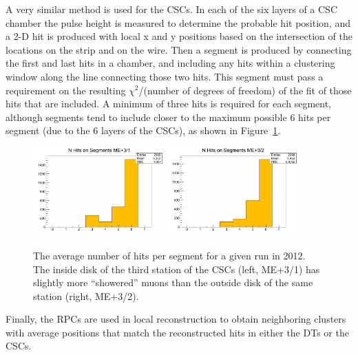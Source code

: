 A very similar method is used for the CSCs.  In each of the six layers of a CSC chamber the pulse height is measured to determine the probable hit position, and a 2-D hit is produced with local x and y positions based on the intersection of the locations on the strip and on the wire.  Then a segment is produced by connecting the first and last hits in a chamber, and including any hits within a clustering window along the line connecting those two hits.  This segment must pass a requirement on the resulting $\chi^2$/(number of degrees of freedom) of the fit of those hits that are included.  A minimum of three hits is required for each segment, although segments tend to include closer to the maximum possible 6 hits per segment (due to the 6 layers of the CSCs), as shown in Figure~\ref{figapp:SegmentsPerHit}.

\begin{figure}[!Hh]
       \centering
       \includegraphics[width=0.45\textwidth]{Figures/Segments_hSnHits+31.png} 
       \includegraphics[width=0.45\textwidth]{Figures/Segments_hSnHits+32.png} \\
       \caption[Average hits per segment in a cathode strip chamber]{The average number of hits per segment for a given run in 2012.  The inside disk of the third station of the CSCs (left, ME+3/1) has slightly more ``showered'' muons than the outside disk of the same station (right, ME+3/2).}
\label{figapp:SegmentsPerHit}
\end{figure}

Finally, the RPCs are used in local reconstruction to obtain neighboring clusters with average positions that match the reconstructed hits in either the DTs or the CSCs.

